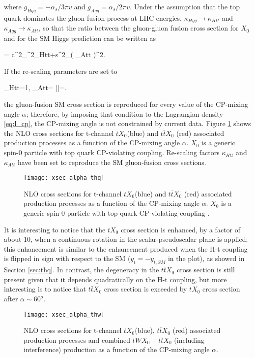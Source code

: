 \noindent where $g_{Hgg}=-\alpha_s/3\pi v$ and $g_{Agg}= \alpha_s/2\pi v$.  Under the assumption that the top quark dominates the gluon-fusion process at LHC energies, $\kappa_{Hgg} \to \kappa_{Htt}$ and  $\kappa_{Agg} \to \kappa_{Att}$, so that the ratio between the gluon-gluon fusion cross section for $X_0$ and for the SM Higgs prediction can be written as     

\beqn
{}=  c^2_\alpha\kappa^2_{Htt}+s^2_\alpha \left( \kappa_{Att} \right)^2.
\label{eq:GFrate}
\eeqn

If the re-scaling parameters are set to

\beqn
\kappa_{Htt}=1, \qquad \kappa_{Att}= \left|\right|=.
\eeqn

\noindent the gluon-fusion SM cross section is reproduced for every value of the CP-mixing angle $\alpha$; therefore, by imposing that condition to the Lagrangian density \ref{eq:l_cp}, the CP-mixing angle is not constrained by current data. Figure \ref{xsec_alpha_thq} shows the NLO cross sections for t-channel $tX_0$(blue) and $t\bar{t}X_0$ (red) associated production processes as a function of the CP-mixing angle $\alpha$. $X_0$ is a generic spin-0 particle with top quark CP-violating coupling. Re-scaling factors $\kappa_{Htt}$ and  $\kappa_{Att}$ have been set to reproduce the SM gluon-fusion cross sections.   

\begin{figure}[h!]
\centering
\texttt{[image: xsec\_alpha\_thq]}
\caption[NLO cross section for $tX_0$ and $t\bar{t}X_0$.]{NLO cross sections for t-channel $tX_0$(blue) and $t\bar{t}X_0$ (red) associated production processes as a function of the CP-mixing angle $\alpha$. $X_0$ is a generic spin-0 particle with top quark CP-violating coupling \cite{maltoni2}.} 
\label{xsec_alpha_thq}
\end{figure}

It is interesting to notice that the $tX_0$ cross section is enhanced, by a factor of about 10, when a continuous rotation in the scalar-pseudoscalar plane is applied; this enhancement is similar to the enhancement produced when the H-t coupling is flipped in sign with respect to the SM ($y_t=-y_{t,SM}$ in the plot), as showed in Section \ref{sec:thq}. In contrast, the degeneracy in the $t\bar{t}X_0$ cross section is still present given that it depends quadratically on the H-t coupling, but more interesting is to notice that $t\bar{t}X_0$ cross section is exceeded by $tX_0$ cross section after $\alpha\sim 60^o$.
\begin{figure}[h!]
\centering
\texttt{[image: xsec\_alpha\_thw]}
\caption[NLO cross section for $tWX_0$, $t\bar{t}X_0$.]{NLO cross sections for t-channel $tX_0$(blue), $t\bar{t}X_0$ (red) associated production processes and combined $tWX_0 + t\bar{t}X_0$ (including interference) production as a function of the CP-mixing angle $\alpha$\cite{maltoni2}.} 
\label{xsec_alpha_thw}
\end{figure}

